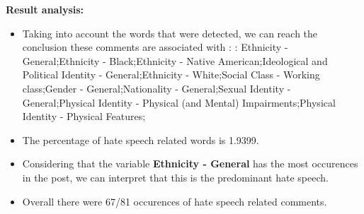 \documentclass[11pt]{article}
\begin{document}
\textbf{\Large Result analysis:}

\begin{itemize}\item Taking into account the words that were detected, we can reach the conclusion these comments are associated with : : Ethnicity - General;Ethnicity - Black;Ethnicity - Native American;Ideological and Political Identity - General;Ethnicity - White;Social Class - Working class;Gender - General;Nationality - General;Sexual Identity - General;Physical Identity - Physical (and Mental) Impairments;Physical Identity - Physical Features;%

\item The percentage of hate speech related words is 1.9399.

\item Considering that the variable \textbf{Ethnicity - General} has the most occurences in the post, we can interpret that this is the predominant hate speech.

\item Overall there were 67/81 occurences of hate speech related comments.\end{itemize}
\end{document}
